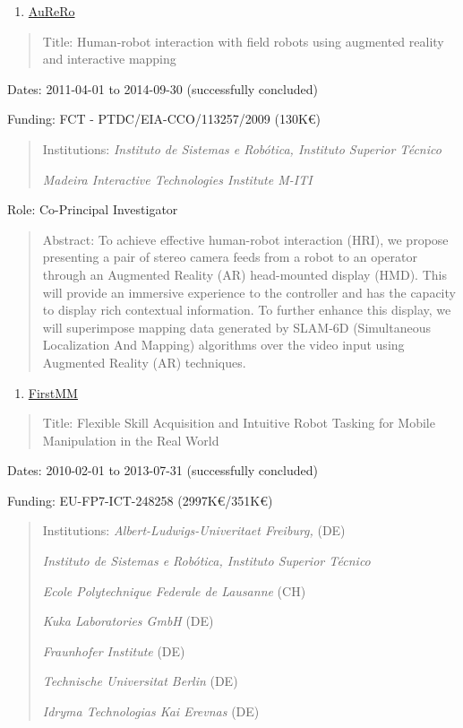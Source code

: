 \begin{enumerate}
\def\labelenumi{\arabic{enumi}.}
\setcounter{enumi}{8}
\item
  \ul{AuReRo}
\end{enumerate}

\begin{quote}
Title: Human-robot interaction with field robots using augmented reality
and interactive mapping
\end{quote}

Dates: 2011-04-01 to 2014-09-30 (successfully concluded)

Funding: FCT - PTDC/EIA-CCO/113257/2009 (130K€)

\begin{quote}
Institutions: \emph{Instituto de Sistemas e Robótica, Instituto Superior
Técnico}

\emph{Madeira Interactive Technologies Institute M-ITI}
\end{quote}

Role: Co-Principal Investigator

\begin{quote}
Abstract: To achieve effective human-robot interaction (HRI), we propose
presenting a pair of stereo camera feeds from a robot to an operator
through an Augmented Reality (AR) head-mounted display (HMD). This will
provide an immersive experience to the controller and has the capacity
to display rich contextual information. To further enhance this display,
we will superimpose mapping data generated by SLAM-6D (Simultaneous
Localization And Mapping) algorithms over the video input using
Augmented Reality (AR) techniques.
\end{quote}

\begin{enumerate}
\def\labelenumi{\arabic{enumi}.}
\setcounter{enumi}{9}
\item
  \ul{FirstMM}
\end{enumerate}

\begin{quote}
Title: Flexible Skill Acquisition and Intuitive Robot Tasking for Mobile
Manipulation in the Real World
\end{quote}

Dates: 2010-02-01 to 2013-07-31 (successfully concluded)

Funding: EU-FP7-ICT-248258 (2997K€/351K€)

\begin{quote}
Institutions: \emph{Albert-Ludwigs-Univeritaet Freiburg,} (DE)

\emph{Instituto de Sistemas e Robótica, Instituto Superior Técnico}

\emph{Ecole Polytechnique Federale de Lausanne} (CH)

\emph{Kuka Laboratories GmbH} (DE)

\emph{Fraunhofer Institute} (DE)

\emph{Technische Universitat Berlin} (DE)

\emph{Idryma Technologias Kai Erevnas} (DE)
\end{quote}

